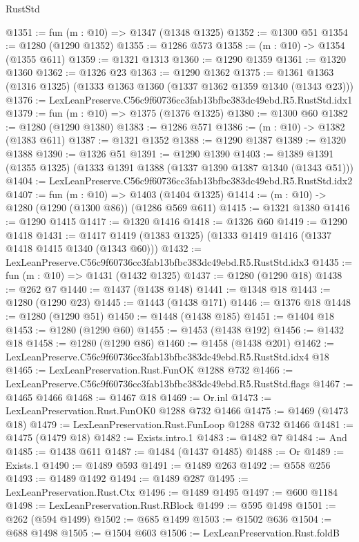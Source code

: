 \begin{lexlean}{RustStd}
\begin{coremodule}
@1351 := fun (m : @10) => @1347 (@1348 @1325)
@1352 := @1300 @51
@1354 := @1280 (@1290 @1352)
@1355 := @1286 @573
@1358 := (m : @10) -> @1354 (@1355 @611)
@1359 := @1321 @1313
@1360 := @1290 @1359
@1361 := @1320 @1360
@1362 := @1326 @23
@1363 := @1290 @1362
@1375 := @1361 @1363 (@1316 @1325) (@1333 @1363 @1360 (@1337 @1362 @1359 @1340 (@1343 @23)))
@1376 := LexLeanPreserve.C56c9f60736cc3fab13bfbc383dc49ebd.R5.RustStd.idx1
@1379 := fun (m : @10) => @1375 (@1376 @1325)
@1380 := @1300 @60
@1382 := @1280 (@1290 @1380)
@1383 := @1286 @571
@1386 := (m : @10) -> @1382 (@1383 @611)
@1387 := @1321 @1352
@1388 := @1290 @1387
@1389 := @1320 @1388
@1390 := @1326 @51
@1391 := @1290 @1390
@1403 := @1389 @1391 (@1355 @1325) (@1333 @1391 @1388 (@1337 @1390 @1387 @1340 (@1343 @51)))
@1404 := LexLeanPreserve.C56c9f60736cc3fab13bfbc383dc49ebd.R5.RustStd.idx2
@1407 := fun (m : @10) => @1403 (@1404 @1325)
@1414 := (m : @10) -> @1280 (@1290 (@1300 @86)) (@1286 @569 @611)
@1415 := @1321 @1380
@1416 := @1290 @1415
@1417 := @1320 @1416
@1418 := @1326 @60
@1419 := @1290 @1418
@1431 := @1417 @1419 (@1383 @1325) (@1333 @1419 @1416 (@1337 @1418 @1415 @1340 (@1343 @60)))
@1432 := LexLeanPreserve.C56c9f60736cc3fab13bfbc383dc49ebd.R5.RustStd.idx3
@1435 := fun (m : @10) => @1431 (@1432 @1325)
@1437 := @1280 (@1290 @18)
@1438 := @262 @7
@1440 := @1437 (@1438 @148)
@1441 := @1348 @18
@1443 := @1280 (@1290 @23)
@1445 := @1443 (@1438 @171)
@1446 := @1376 @18
@1448 := @1280 (@1290 @51)
@1450 := @1448 (@1438 @185)
@1451 := @1404 @18
@1453 := @1280 (@1290 @60)
@1455 := @1453 (@1438 @192)
@1456 := @1432 @18
@1458 := @1280 (@1290 @86)
@1460 := @1458 (@1438 @201)
@1462 := LexLeanPreserve.C56c9f60736cc3fab13bfbc383dc49ebd.R5.RustStd.idx4 @18
@1465 := LexLeanPreservation.Rust.FunOK @1288 @732
@1466 := LexLeanPreserve.C56c9f60736cc3fab13bfbc383dc49ebd.R5.RustStd.flags
@1467 := @1465 @1466
@1468 := @1467 @18
@1469 := Or.inl
@1473 := LexLeanPreservation.Rust.FunOK0 @1288 @732 @1466
@1475 := @1469 (@1473 @18)
@1479 := LexLeanPreservation.Rust.FunLoop @1288 @732 @1466
@1481 := @1475 (@1479 @18)
@1482 := Exists.intro.{1}
@1483 := @1482 @7
@1484 := And
@1485 := @1438 @611
@1487 := @1484 (@1437 @1485)
@1488 := Or
@1489 := Exists.{1}
@1490 := @1489 @593
@1491 := @1489 @263
@1492 := @558 @256
@1493 := @1489 @1492
@1494 := @1489 @287
@1495 := LexLeanPreservation.Rust.Ctx
@1496 := @1489 @1495
@1497 := @600 @1184
@1498 := LexLeanPreservation.Rust.RBlock
@1499 := @595 @1498
@1501 := @262 (@594 @1499)
@1502 := @685 @1499
@1503 := @1502 @636
@1504 := @688 @1498
@1505 := @1504 @603
@1506 := LexLeanPreservation.Rust.foldB

\end{coremodule}
\end{lexlean}
